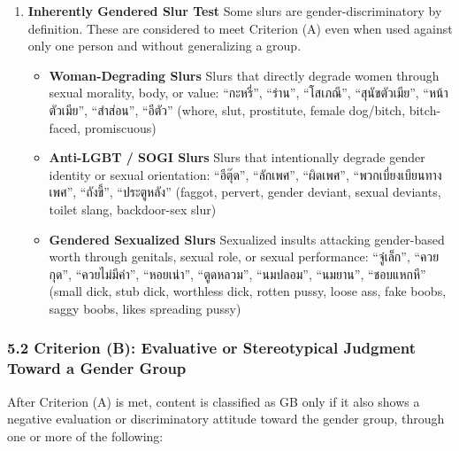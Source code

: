 \documentclass[12pt,oneside,openright,a4paper]{cpe-english-project}
\begin{document}
\begin{enumerate}
\setlength{\itemsep}{0.15\baselineskip}
\setlength{\parsep}{0pt}
\setlength{\parskip}{0pt}
\def\labelenumi{\arabic{enumi}.}
\setcounter{enumi}{2}
\item
  \textbf{Inherently Gendered Slur Test}
  Some slurs are gender-discriminatory by definition. These are
  considered to meet Criterion (A) even when used against only one
  person and without generalizing a group.

  \begin{itemize}
\setlength{\itemsep}{0.15\baselineskip}
\setlength{\parsep}{0pt}
\setlength{\parskip}{0pt}
    \item
    \textbf{Woman-Degrading Slurs}
    Slurs that directly degrade women through sexual morality, body, or
    value:
    ``กะหรี่'', ``ร่าน'', ``โสเภณี'', ``สุนัขตัวเมีย'', ``หน้าตัวเมีย'', ``สำส่อน'',
    ``อีตัว''
    (whore, slut, prostitute, female dog/bitch, bitch-faced,
    promiscuous)
  \item
    \textbf{Anti-LGBT / SOGI Slurs}
    Slurs that intentionally degrade gender identity or sexual
    orientation:
    ``อีตุ๊ด'', ``ลักเพศ'', ``ผิดเพศ'', ``พวกเบี่ยงเบียนทางเพศ'', ``ถังขี้'',
    ``ประตูหลัง''
    (faggot, pervert, gender deviant, sexual deviants, toilet slang,
    backdoor-sex slur)
  \item
    \textbf{Gendered Sexualized Slurs}
    Sexualized insults attacking gender-based worth through genitals,
    sexual role, or sexual performance:
    ``จู๋เล็ก'', ``ควยกุด'', ``ควยไม่มีค่า'', ``หอยเน่า'', ``ตูดหลวม'',
    ``นมปลอม'', ``นมยาน'', ``ชอบแหกหี''
    (small dick, stub dick, worthless dick, rotten pussy, loose ass,
    fake boobs, saggy boobs, likes spreading pussy)
  \end{itemize}
\end{enumerate}

\subsubsection{5.2 Criterion (B): Evaluative or Stereotypical Judgment Toward a Gender Group}\label{criterion-b-evaluative-or-stereotypical-judgment-toward-a-gender-group}

After Criterion (A) is met, content is classified as GB only if it also
shows a negative evaluation or discriminatory attitude toward the gender
group, through one or more of the following:
\end{document}
